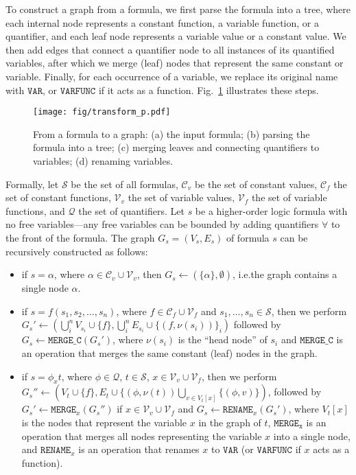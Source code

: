 \documentclass{article}
\begin{document}
To construct a graph from a formula, we first parse the formula into a tree, where each
internal node represents a constant function, a variable function, or a quantifier, and each leaf node represents a variable value 
or a constant value. We then add edges that connect a quantifier node to all instances of its quantified
variables, after which we merge (leaf) nodes that represent the same constant or
variable. Finally, for each occurrence of a variable, we replace its original 
name with $\mathtt{VAR}$, or $\mathtt{VARFUNC}$ if it acts as a function. Fig.~\ref{fig:example} illustrates these
steps.

\begin{figure}[!htbp]
  \centering
  \texttt{[image: fig/transform\_p.pdf]}\\
  \caption{From a formula to a graph: (a)
    the input formula; (b) parsing the formula into a tree; (c) merging leaves and
    connecting quantifiers to variables; (d) renaming variables.}
    \label{fig:example}
    \vspace{-2mm}
\end{figure}

Formally, let $\mathcal{S}$ be the set of all formulas, $\mathcal{C}_v$ be the set of
constant values, $\mathcal{C}_f$ the set of constant functions, $\mathcal{V}_v$ the set of
variable values, $\mathcal{V}_f$ the set of variable functions, and $\mathcal{Q}$ the set
of quantifiers. Let $s$ be a higher-order logic formula with no free variables---any free
variables can be bounded by adding quantifiers $\forall$ to the front of the formula. The graph $G_s=(V_s, E_s)$ of formula $s$ can be recursively
constructed as follows: 

\begin{itemize}
\item if $s = \alpha$, where $\alpha \in \mathcal{C}_v \cup \mathcal{V}_v$, then $G_s \leftarrow
  (\{\alpha\},\emptyset)$, i.e.\@ the graph contains a single node $\alpha$. 
\item if $s = f(s_1, s_2, \dots, s_n)$, where $f \in \mathcal{C}_f \cup \mathcal{V}_f$ and $s_1, \dots, s_n
  \in \mathcal{S}$, then we perform $G_s' \leftarrow  \left(\bigcup_i^n V_{s_i} \cup \{f\} , 
    \bigcup_i^n E_{s_i} \cup \{(f,\nu(s_i))\}_i \right)$ followed by  $G_s \leftarrow
  \mathtt{MERGE\_C}(G_s')$,  where $\nu(s_i)$ is the
``head node'' of $s_i$ and $\mathtt{MERGE\_C}$  is an operation that merges the same
  constant (leaf) nodes in the graph. 
\item if $s = \phi_x t$, where $\phi \in \mathcal{Q}$, $t\in \mathcal{S}$, $x \in
  \mathcal{V}_v \cup \mathcal{V}_f$, then we perform
$G_s'' \leftarrow \left(V_{t} \cup \{f\} ,
    E_{t} \cup \{(\phi,\nu(t)) \bigcup_{v\in V_{t}[x]} \{(\phi, v)\}
  \right)$, followed by $G_s' \leftarrow \mathtt{MERGE}_x(G_s'')$ if $x \in \mathcal{V}_v \cup \mathcal{V}_f$ and
  $G_s \leftarrow \mathtt{RENAME}_x(G_s')$, where $V_t[x]$ is the nodes that
  represent the variable $x$ in the graph of $t$,  $\mathtt{MERGE_x}$ is an operation that
  merges all nodes representing the variable $x$ into a single node, and
  $\mathtt{RENAME}_x$ is an operation that renames $x$ to $\mathtt{VAR}$
  (or $\mathtt{VARFUNC}$ if $x$ acts as a function). 
\end{itemize}
\end{document}
